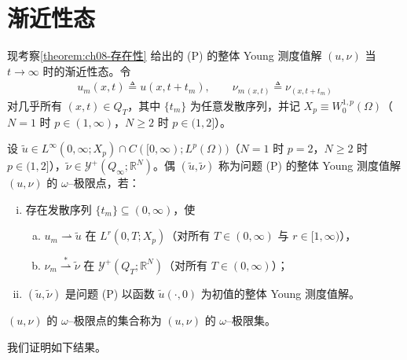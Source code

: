 \documentclass[../../main.tex]{subfiles}%
\begin{document}
\section{渐近性态}\label{section:ch08-渐近性态}

现考察\cref{theorem:ch08-存在性} 给出的 (P) 的整体 Young 测度值解 $(u,\nu)$ 当 $t\to\infty$ 时的渐近性态。令
\begin{align}
u_m(x,t)\triangleq u(x,t+t_m),\qquad
\nu_{m\,(x,t)}\triangleq \nu_{(x,t+t_m)} \label{align:ch08-8.68}
\end{align}
对几乎所有 $(x,t)\in Q_T$，其中 $\{t_m\}$ 为任意发散序列，并记 $X_p\equiv W^{1,p}_0(\Omega)$（$N=1$ 时 $p\in(1,\infty)$，$N\geqslant2$ 时 $p\in(1,2]$）。

\begin{definition}\label{definition:ch08-omega极限点}
设 $\tilde u\in L^\infty(0,\infty;X_p)\cap C([0,\infty);L^p(\Omega))$（$N=1$ 时 $p=2$，$N\geqslant2$ 时 $p\in(1,2]$），$\tilde\nu\in\mathcal{Y}^+(Q_\infty;\mathbb{R}^N)$。偶 $(\tilde u,\tilde\nu)$ 称为问题 (P) 的整体 Young 测度值解 $(u,\nu)$ 的 $\omega$--极限点，若：
\begin{enumerate}[(i)]
\item\label{item:ch08-omega-i} 存在发散序列 $\{t_m\}\subseteq(0,\infty)$，使
\begin{enumerate}[a)]
\item\label{item:ch08-omega-i-a} $u_m\rightharpoonup\tilde u$ 在 $L^r(0,T;X_p)$（对所有 $T\in(0,\infty)$ 与 $r\in[1,\infty)$），
\item\label{item:ch08-omega-i-b} $\nu_m\stackrel{*}{\rightharpoonup}\tilde\nu$ 在 $\mathcal{Y}^+(Q_T;\mathbb{R}^N)$（对所有 $T\in(0,\infty)$）；
\end{enumerate}
\item\label{item:ch08-omega-ii} $(\tilde u,\tilde\nu)$ 是问题 (P) 以函数 $\tilde u(\cdot,0)$ 为初值的整体 Young 测度值解。
\end{enumerate}
$(u,\nu)$ 的 $\omega$--极限点的集合称为 $(u,\nu)$ 的 $\omega$--极限集。
\end{definition}

我们证明如下结果。
\end{document}
